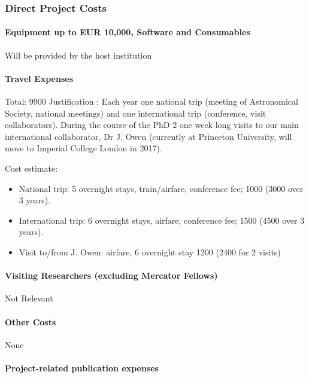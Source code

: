 \documentclass[10pt,fleqn,twoside]{article}
\begin{document}
\subsubsection{Direct Project Costs}


\paragraph{Equipment up to EUR 10,000, Software and Consumables}

Will be provided by the host institution

\paragraph{Travel Expenses}

Total: 9900 \EUR{} Justification : Each year one national trip (meeting of Astronomical Society, national
meetings) and one international trip (conference, visit
collaborators). 
During the course of the PhD 2 one week long visits to our main
international collaborator, Dr J. Owen (currently at Princeton
University, will move to Imperial College London in 2017). 

Cost estimate: 
\begin{itemize}
\item National trip: 5 overnight stays, train/airfare,
conference fee; 1000 \EUR{} (3000 over 3 years).
\item International trip: 6 overnight stays, airfare, conference fee;
  1500 \EUR{} (4500 over 3 years).
\item Visit to/from J. Owen: airfare, 6 overnight stay 1200 \EUR{} (2400
  for 2 visits)
\end{itemize}

\paragraph{Visiting Researchers (excluding Mercator Fellows)}

Not Relevant 

\paragraph{Other Costs}

None

\paragraph{Project-related publication expenses}
\end{document}
